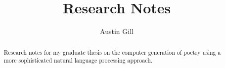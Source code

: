 \documentclass{article}
\title{Research Notes}
\author{Austin Gill}
\begin{document}
\maketitle

\begin{abstract}
    Research notes for my graduate thesis on the computer generation of poetry using a more sophisticated natural language processing approach.
\end{abstract}

\thispagestyle{empty}
\begingroup
\hypersetup{linkcolor=black}
\tableofcontents
\endgroup








\newpage

\nocite{*}


{}
\end{document}
